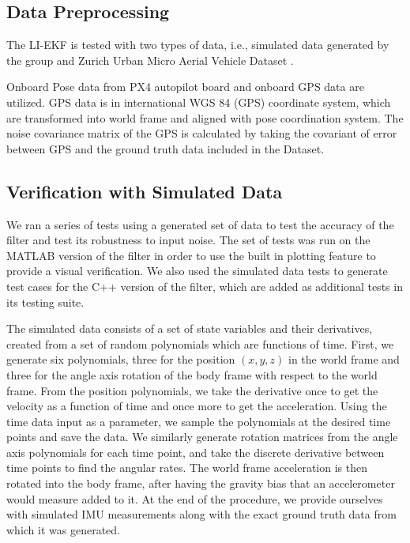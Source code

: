\subsection{Data Preprocessing}
The LI-EKF is tested with two types of data, i.e., simulated data generated by the group and Zurich Urban Micro Aerial Vehicle Dataset \cite{majdik2017zurich}. 

Onboard Pose data from PX4 autopilot board and onboard GPS data are utilized. GPS data is in international WGS 84 (GPS) coordinate system, which are transformed into world frame and aligned with pose coordination system. The noise covariance matrix of the GPS is calculated by taking the covariant of error between GPS and the ground truth data included in the Dataset. 

\subsection{Verification with Simulated Data}

We ran a series of tests using a generated set of data to test the accuracy of the filter and test its robustness to input noise.  The set of tests was run on the MATLAB version of the filter in order to use the built in plotting feature to provide a visual verification.  We also used the simulated data tests to generate test cases for the C++ version of the filter, which are added as additional tests in its testing suite.

The simulated data consists of a set of state variables and their derivatives, created from a set of random polynomials which are functions of time.  First, we generate six polynomials, three for the position $(x, y, z)$ in the world frame and three for the angle axis rotation of the body frame with respect to the world frame.  From the position polynomials, we take the derivative once to get the velocity as a function of time and once more to get the acceleration.  Using the time data input as a parameter, we sample the polynomials at the desired time points and save the data.  We similarly generate rotation matrices from the angle axis polynomials for each time point, and take the discrete derivative between time points to find the angular rates.  The world frame acceleration is then rotated into the body frame, after having the gravity bias that an accelerometer would measure added to it.  At the end of the procedure, we provide ourselves with simulated IMU measurements along with the exact ground truth data from which it was generated.

